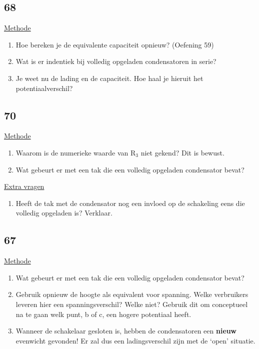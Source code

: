 \subsection*{68}
\underline{Methode}
\begin{enumerate}
\item Hoe bereken je de equivalente capaciteit opnieuw? (Oefening 59) 
\item Wat is er indentiek bij  volledig opgeladen condensatoren in serie?
\item Je weet nu de lading en de capaciteit. Hoe haal je hieruit het potentiaalverschil?
\end{enumerate}

\subsection*{70}
\underline{Methode}
\begin{enumerate}
\item Waarom is de numerieke waarde van R$_3$ niet gekend? Dit is bewust.
\item Wat gebeurt er met een tak die een volledig opgeladen condensator bevat?
\end{enumerate}

\underline{Extra vragen}
\begin{enumerate}
\item Heeft de tak met de condensator nog een invloed op de schakeling eens die volledig opgeladen is? Verklaar.
\end{enumerate}




\subsection*{67}
\underline{Methode}
\begin{enumerate}
	\item Wat gebeurt er met een tak die een volledig opgeladen condensator bevat?
	\item Gebruik opnieuw de hoogte als equivalent voor spanning. Welke verbruikers leveren hier een spanningsverschil? Welke niet? Gebruik dit om conceptueel na te gaan welk punt, b of c, een hogere potentiaal heeft.
	\item Wanneer de schakelaar gesloten is, hebben de condensatoren een \textbf{nieuw} evenwicht gevonden! Er zal dus een ladingsverschil zijn met de `open' situatie.
\end{enumerate}


